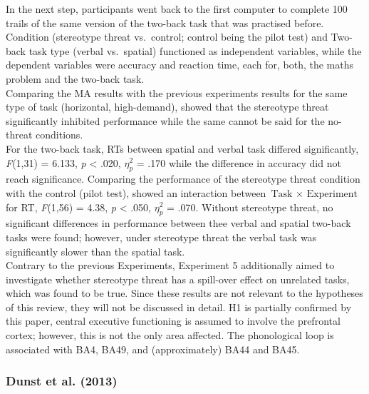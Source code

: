\documentclass[
  stu,floatsintext]{apa7}
\begin{document}
In the next step, participants went back to the first computer to complete 100 trails of the same version of the two-back task that was practised before.\\
Condition (stereotype threat vs.~control; control being the pilot test) and Two-back task type (verbal vs.~spatial) functioned as independent variables, while the dependent variables were accuracy and reaction time, each for, both, the maths problem and the two-back task.\\
Comparing the MA results with the previous experiments results for the same type of task (horizontal, high-demand), showed that the stereotype threat significantly inhibited performance while the same cannot be said for the no-threat conditions.\\
For the two-back task, RTs between spatial and verbal task differed significantly, \emph{F}(1,31) = 6.133, \emph{p} \textless{} .020, \(\eta^{2}_{p}\) = .170 while the difference in accuracy did not reach significance.
Comparing the performance of the stereotype threat condition with the control (pilot test), showed an interaction between \(\text{Task } \times \text{ Experiment }\) for RT, \emph{F}(1,56) = 4.38, \emph{p} \textless{} .050, \(\eta^{2}_{p}\) = .070.
Without stereotype threat, no significant differences in performance between thee verbal and spatial two-back tasks were found; however, under stereotype threat the verbal task was significantly slower than the spatial task.\\
Contrary to the previous Experiments, Experiment 5 additionally aimed to investigate whether stereotype threat has a spill-over effect on unrelated tasks, which was found to be true.
Since these results are not relevant to the hypotheses of this review, they will not be discussed in detail.
H1 is partially confirmed by this paper, central executive functioning is assumed to involve the prefrontal cortex; however, this is not the only area affected.
The phonological loop is associated with BA4, BA49, and (approximately) BA44 and BA45.

\subsubsection{Dunst et al. (2013)}\label{dunstsexdifferencesneural2013}
\end{document}
